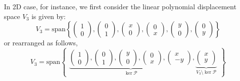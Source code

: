 In 2D case, for instance, we first consider the linear polynomial displacement space $V_3$ is given by:
\begin{equation}
V_3 = \mathrm{span} \left \{
\begin{pmatrix} 1 \\ 0 \end{pmatrix},
\begin{pmatrix} 0 \\ 1 \end{pmatrix},
\begin{pmatrix} x \\ 0 \end{pmatrix},
\begin{pmatrix} 0 \\ x \end{pmatrix},
\begin{pmatrix} y \\ 0 \end{pmatrix},
\begin{pmatrix} 0 \\ y \end{pmatrix}
\right \}
\end{equation}
or rearranged as follows,
\begin{equation}\label{base1}
V_3 = \mathrm{span} 
\begin{Bmatrix}
\underbrace{
\begin{pmatrix} 1 \\ 0 \end{pmatrix},
\begin{pmatrix} 0 \\ 1 \end{pmatrix},
\begin{pmatrix} y \\ 0 \end{pmatrix},
\begin{pmatrix} 0 \\ x \end{pmatrix},
\begin{pmatrix} x \\ -y \end{pmatrix}
}_{\ker \mathcal P},
\underbrace{
\begin{pmatrix} x \\ y \end{pmatrix}
}_{V_3\setminus \ker \mathcal P}
\end{Bmatrix}
\end{equation}
